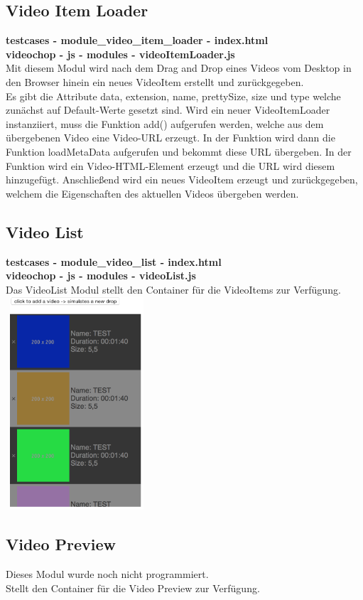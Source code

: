 \documentclass[a4paper,10pt]{scrartcl}
\begin{document}
\subsection{Video Item Loader}
\textbf{testcases - module\_video\_item\_loader - index.html} \\
\textbf{videochop - js - modules - videoItemLoader.js} \\
Mit diesem Modul wird nach dem Drag and Drop eines Videos vom Desktop in den Browser hinein ein neues VideoItem erstellt und zurückgegeben.\\
Es gibt die Attribute data, extension, name, prettySize, size und type welche zunächst auf Default-Werte gesetzt sind.
Wird ein neuer VideoItemLoader instanziiert, muss die Funktion add() aufgerufen werden, welche aus dem übergebenen Video eine Video-URL erzeugt. In der Funktion wird dann die Funktion loadMetaData aufgerufen und bekommt diese URL übergeben. In der Funktion wird ein Video-HTML-Element erzeugt und die URL wird diesem hinzugefügt. Anschließend wird ein neues VideoItem erzeugt und zurückgegeben, welchem die Eigenschaften des aktuellen Videos übergeben werden.
\subsection{Video List}
\textbf{testcases - module\_video\_list - index.html} \\
\textbf{videochop - js - modules - videoList.js} \\
Das VideoList Modul stellt den Container für die VideoItems zur Verfügung.\\
\includegraphics[height=300px, width=200px]{images/videolist.png}\\
\subsection{Video Preview}
Dieses Modul wurde noch nicht programmiert.\\
Stellt den Container für die Video Preview zur Verfügung.
\end{document}
